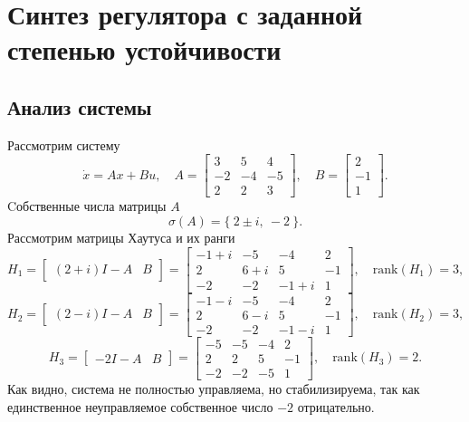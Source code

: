 \section{Синтез регулятора с заданной степенью устойчивости}

\subsection{Анализ системы} \label{sec:anal1}

Рассмотрим систему
\begin{equation}
    \dot x=Ax+Bu,\quad A=\begin{bmatrix}
        3&5&4\\
        -2&-4&-5\\
        2&2&3
    \end{bmatrix},\quad B=\begin{bmatrix}
        2\\-1\\1
    \end{bmatrix}.
    \label{eq:sys1}
\end{equation}
Cобственные числа матрицы $A$
\begin{equation*}
    \sigma(A)=\{\ 2\pm i,\ -2\ \}.
\end{equation*}
Рассмотрим матрицы Хаутуса и их ранги
\begin{equation*}
    H_1 = \begin{bmatrix}
        (2+ i) I - A & B
    \end{bmatrix} =
    \begin{bmatrix}
        -1 + i & -5 & -4 & 2 \\ 
         2 &  6 + i &  5 & -1 \\ 
        -2 & -2 & -1 + i &  1
    \end{bmatrix},
    \quad\text{rank}(H_1) = 3,
\end{equation*}
\begin{equation*}
    H_2 = \begin{bmatrix}
        (2- i) I - A & B
    \end{bmatrix} =
    \begin{bmatrix}
        -1 - i & -5 & -4 & 2 \\ 
         2 &  6 - i &  5 & -1 \\ 
        -2 & -2 & -1 - i &  1
    \end{bmatrix},
    \quad\text{rank}(H_2) = 3,
\end{equation*}
\begin{equation*}
    H_3 = \begin{bmatrix}
        -2 I - A & B
    \end{bmatrix} =
    \begin{bmatrix}
        -5 & -5 & -4 &  2 \\ 
         2 &  2 &  5 & -1 \\ 
        -2 & -2 & -5 &  1
    \end{bmatrix},
    \quad\text{rank}(H_3) = 2.
\end{equation*}
Как видно, система не полностью управляема, но стабилизируема, так как единственное
неуправляемое собственное число $-2$ отрицательно.

